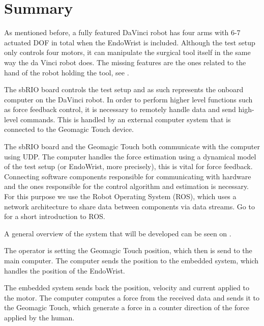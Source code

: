 \section{Summary}
As mentioned before, a fully featured DaVinci robot has four arms with 6-7 actuated \gls{DOF} in total when the EndoWrist is included.
Although the test setup only controls four motors, it can manipulate the surgical tool itself in the same way the da Vinci robot does. The missing features are the ones related to the hand of the robot holding the tool, see .

The sbRIO board controls the test setup and as such represents the onboard computer on the DaVinci robot.
In order to perform higher level functions such as force feedback control, it is necessary to remotely handle data and send high-level commands.
This is handled by an external computer system that is connected to the Geomagic Touch device.

The sbRIO board and the Geomagic Touch both communicate with the computer using UDP. The computer handles the force estimation using a dynamical model of the test setup (or EndoWrist, more precisely), this is vital for force feedback.
Connecting software components responsible for communicating with hardware and the ones responsible for the control algorithm and estimation is necessary.
For this purpose we use the Robot Operating System (ROS), which uses a network architecture to share data between components via data streams. Go to  for a short introduction to ROS.

A general overview of the system that will be developed can be seen on .




The operator is setting the Geomagic Touch position, which then is send to the main computer. The computer sends the position to the embedded system, which handles the position of the EndoWrist.

The embedded system sends back the position, velocity and current applied to the motor. The computer computes a force from the received data and sends it to the Geomagic Touch, which generate a force in a counter direction of the force applied by the human.
